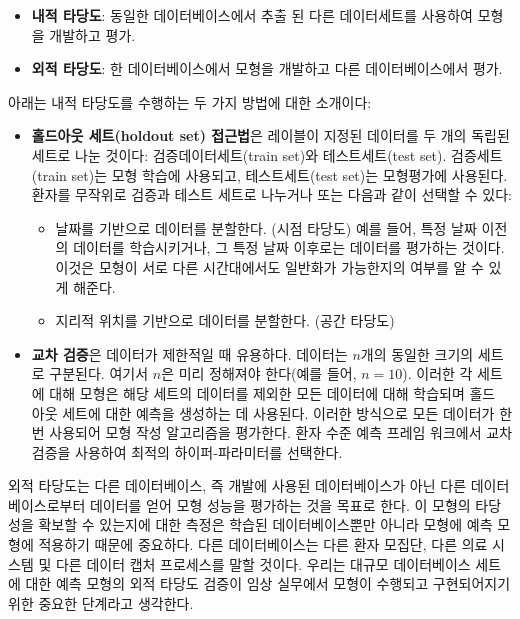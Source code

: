 \documentclass[11pt]{book}
\providecommand{\tightlist}{%
  \setlength{\itemsep}{0pt}\setlength{\parskip}{0pt}}
\theoremstyle{definition}
\theoremstyle{definition}
\theoremstyle{definition}
\theoremstyle{remark}
\begin{document}
\begin{itemize}
\tightlist
\item
  \textbf{내적 타당도}: 동일한 데이터베이스에서 추출 된 다른
  데이터세트를 사용하여 모형을 개발하고 평가.
\item
  \textbf{외적 타당도}: 한 데이터베이스에서 모형을 개발하고 다른
  데이터베이스에서 평가. 
\end{itemize}

아래는 내적 타당도를 수행하는 두 가지 방법에 대한 소개이다:

\begin{itemize}
\tightlist
\item
  \textbf{홀드아웃 세트(holdout set) 접근법}은 레이블이 지정된 데이터를
  두 개의 독립된 세트로 나눈 것이다: 검증데이터세트(train set)와
  테스트세트(test set). 검증세트(train set)는 모형 학습에 사용되고,
  테스트세트(test set)는 모형평가에 사용된다. 환자를 무작위로 검증과
  테스트 세트로 나누거나 또는 다음과 같이 선택할 수 있다:

  \begin{itemize}
  \tightlist
  \item
    날짜를 기반으로 데이터를 분할한다. (시점 타당도) 예를 들어, 특정
    날짜 이전의 데이터를 학습시키거나, 그 특정 날짜 이후로는 데이터를
    평가하는 것이다. 이것은 모형이 서로 다른 시간대에서도 일반화가
    가능한지의 여부를 알 수 있게 해준다.
  \item
    지리적 위치를 기반으로 데이터를 분할한다. (공간 타당도)
  \end{itemize}
\item
  \textbf{교차 검증}은 데이터가 제한적일 때 유용하다. 데이터는 \(n\)개의
  동일한 크기의 세트로 구분된다. 여기서 \(n\)은 미리 정해져야 한다(예를
  들어, \(n=10\)). 이러한 각 세트에 대해 모형은 해당 세트의 데이터를
  제외한 모든 데이터에 대해 학습되며 홀드 아웃 세트에 대한 예측을
  생성하는 데 사용된다. 이러한 방식으로 모든 데이터가 한 번 사용되어
  모형 작성 알고리즘을 평가한다. 환자 수준 예측 프레임 워크에서 교차
  검증을 사용하여 최적의 하이퍼-파라미터를
  선택한다.
\end{itemize}

외적 타당도는 다른 데이터베이스, 즉 개발에 사용된 데이터베이스가 아닌
다른 데이터베이스로부터 데이터를 얻어 모형 성능을 평가하는 것을 목표로
한다. 이 모형의 타당성을 확보할 수 있는지에 대한 측정은 학습된
데이터베이스뿐만 아니라 모형에 예측 모형에 적용하기 때문에 중요하다.
다른 데이터베이스는 다른 환자 모집단, 다른 의료 시스템 및 다른 데이터
캡처 프로세스를 말할 것이다. 우리는 대규모 데이터베이스 세트에 대한 예측
모형의 외적 타당도 검증이 임상 실무에서 모형이 수행되고 구현되어지기
위한 중요한 단계라고 생각한다.
\end{document}
